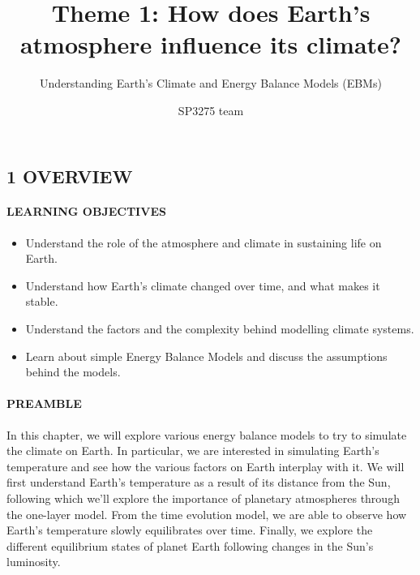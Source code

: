 \documentclass[
  letterpaper,
  DIV=11,
  numbers=noendperiod]{scrartcl}
\title{Theme 1: How does Earth's atmosphere influence its climate?}
\subtitle{Understanding Earth's Climate and Energy Balance Models
(EBMs)}
\author{SP3275 team}
\date{}
\let\oldparagraph\paragraph
\renewcommand{\paragraph}[1]{\oldparagraph{#1}\mbox{}}
\providecommand{\tightlist}{%
  \setlength{\itemsep}{0pt}\setlength{\parskip}{0pt}}\usepackage{longtable,booktabs,array}
\begin{document}
\maketitle
\ifdefined\Shaded\renewenvironment{Shaded}{\begin{tcolorbox}[frame hidden, interior hidden, boxrule=0pt, sharp corners, breakable, enhanced, borderline west={3pt}{0pt}{shadecolor}]}{\end{tcolorbox}}\fi

\hypertarget{overview}{%
\subsection{1 \textbar{} OVERVIEW}\label{overview}}

\hypertarget{learning-objectives}{%
\paragraph{LEARNING OBJECTIVES}\label{learning-objectives}}

\begin{itemize}
\tightlist
\item
  Understand the role of the atmosphere and climate in sustaining life
  on Earth.
\item
  Understand how Earth's climate changed over time, and what makes it
  stable.
\item
  Understand the factors and the complexity behind modelling climate
  systems.
\item
  Learn about simple Energy Balance Models and discuss the assumptions
  behind the models.
\end{itemize}

\hypertarget{preamble}{%
\paragraph{PREAMBLE}\label{preamble}}

In this chapter, we will explore various energy balance models to try to
simulate the climate on Earth. In particular, we are interested in
simulating Earth's temperature and see how the various factors on Earth
interplay with it. We will first understand Earth's temperature as a
result of its distance from the Sun, following which we'll explore the
importance of planetary atmospheres through the one-layer model. From
the time evolution model, we are able to observe how Earth's temperature
slowly equilibrates over time. Finally, we explore the different
equilibrium states of planet Earth following changes in the Sun's
luminosity.
\end{document}
